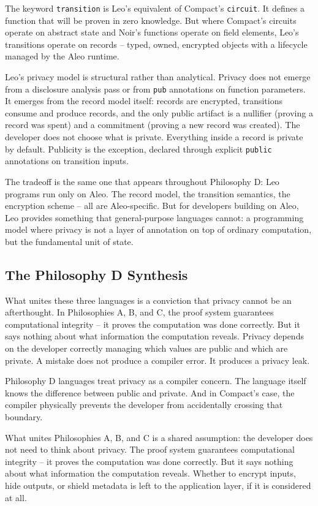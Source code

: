 \documentclass[
  11pt,
  openany]{report}
\begin{document}
The keyword \texttt{transition} is Leo's equivalent of Compact's
\texttt{circuit}. It defines a function that will be proven in zero knowledge.
But where Compact's circuits operate on abstract state and Noir's functions
operate on field elements, Leo's transitions operate on records -- typed, owned,
encrypted objects with a lifecycle managed by the Aleo runtime.

Leo's privacy model is structural rather than analytical. Privacy does not
emerge from a disclosure analysis pass or from \texttt{pub} annotations on
function parameters. It emerges from the record model itself: records are
encrypted, transitions consume and produce records, and the only public artifact
is a nullifier (proving a record was spent) and a commitment (proving a new
record was created). The developer does not choose what is private. Everything
inside a record is private by default. Publicity is the exception, declared
through explicit \texttt{public} annotations on transition inputs.

The tradeoff is the same one that appears throughout Philosophy D: Leo programs
run only on Aleo. The record model, the transition semantics, the encryption
scheme -- all are Aleo-specific. But for developers building on Aleo, Leo
provides something that general-purpose languages cannot: a programming model
where privacy is not a layer of annotation on top of ordinary computation, but
the fundamental unit of state.

\subsection{The Philosophy D Synthesis}\label{the-philosophy-d-synthesis}

What unites these three languages is a conviction that privacy cannot be an
afterthought. In Philosophies A, B, and C, the proof system guarantees
computational integrity -- it proves the computation was done correctly. But it
says nothing about what information the computation reveals. Privacy depends on
the developer correctly managing which values are public and which are private.
A mistake does not produce a compiler error. It produces a privacy leak.

Philosophy D languages treat privacy as a compiler concern. The language itself
knows the difference between public and private. And in Compact's case, the
compiler physically prevents the developer from accidentally crossing that
boundary.

What unites Philosophies A, B, and C is a shared assumption: the developer does
not need to think about privacy. The proof system guarantees computational
integrity -- it proves the computation was done correctly. But it says nothing
about what information the computation reveals. Whether to encrypt inputs, hide
outputs, or shield metadata is left to the application layer, if it is
considered at all.
\end{document}
